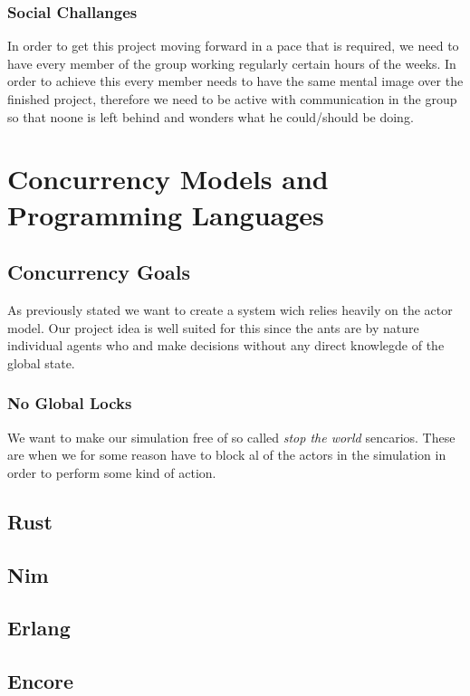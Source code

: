 \documentclass[a4paper]{article}
\begin{document}
\subsubsection{Social Challanges}
In order to get this project moving forward in a pace that is required, we need to have every member of the group working regularly certain hours of the weeks. In order to achieve this every member needs to have the same mental image over the finished project, therefore we need to be active with communication in the group so that noone is left behind and wonders what he could/should be doing. 

\section{Concurrency Models and Programming Languages}
\subsection{Concurrency Goals}
As previously stated we want to create a system wich relies heavily on the actor model. Our project idea
is well suited for this since the ants are by nature individual agents who and make decisions without any direct knowlegde
of the global state.
\subsubsection{No Global Locks}
We want to make our simulation free of so called \emph{stop the world}
sencarios. These are when we for some reason have to block al of the actors in
the simulation in order to perform some kind of action.


\subsection{Rust}

\subsection{Nim}

\subsection{Erlang}

\subsection{Encore}
\end{document}

